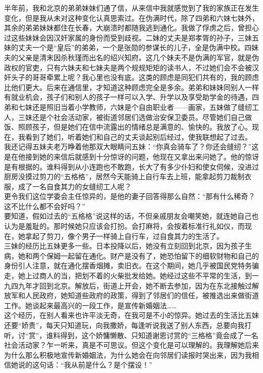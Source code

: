 半年前，我和北京的弟弟妹妹们通了信，从来信中我就感觉到了我的家族正在发生变化，但是我从未对这种变化认真思索过。在伪满时代，除了四弟和六妹七妹外，其余的弟弟妹妹都住在长春，大崩溃时都随我逃到通化。我做了俘虏之后，曾担心过这些妹妹会因汉奸家属的身份而受到歧视。二妹的丈夫是郑孝胥的孙子，三妹五妹的丈夫一个是“皇后”的弟弟，一个是张勋的参谋长的儿子，全是伪满中校。四妹夫的父亲是清末因杀秋瑾而出名的绍兴知府。这几个妹夫不是伪满的军官，就是伪政权的官吏，只有六妹夫和七妹夫是两个规规矩矩的读书人，不过她们会不会被汉奸头子的哥哥牵累上呢？我心里也没有底。这类的顾虑是同犯们共有的，我的顾虑比他们更大。后来在通信里，才知道这种顾虑完全是多余。弟弟和妹妹同别人一样有就业机会，孩子们和别人的孩子一样可以入学、升学以及享受助学金的待遇，四弟和七妹还是照旧当着小学教师，六妹是个自由职业者——画家，五妹做了缝纫工人，三妹还是个社会活动家，被街道邻居们选做治安保卫委员。尽管她们自己做饭、照顾孩子，但是她们在信中流露出的情绪总是满意的、愉快的。我放了心。现在，我看到了她们，听着她们和自己的丈夫谈起别后经过，使我联想起了过去。\\

我还记得五妹夫老万睁着他那双大眼睛问五妹：“你真会骑车了？你还会缝纫？”这是在他接到她的来信后就感到十分惊讶的问题，他现在又拿出来问她了。他的惊讶是有根据的。谁料得到从小连跑也不敢跑，长大了有多少仆妇和使女伺候，没进过厨房没摸过剪刀的“五格格”，居然今天能骑上自行车去上班，能拿起剪刀裁制衣服，成了一名自食其力的女缝纫工人呢？\\

更令我们这位学委会主任惊异的，是他的妻子回答得那么自然：“那有什么稀奇？这不比什么都不会好吗？”\\

要知道，假如过去的“五格格”说这样的话，不但亲戚朋友会嘲笑她，就连她自己也认为是羞耻的。那时候她只应该会打扮。会打麻将，会按着标准行礼如仪，而现在，她拿起了剪刀，像个男子一样骑上自行车，过自食其力的生活了。\\

三妹的经历比五妹更多一些。日本投降以后，她没有立刻回到北京，因为孩子生病，她和两个保姆一起留在通化。财产是没有了，她恐怕留下的细软财物和自己的身份引人注意，就在通化摆香烟摊，卖旧衣。在这个期间，她几乎被国民党特务骗走，她上过商人的当，把划不着的火柴批发给她。她经过这些不平常的生活，到一九四九年才回到北京。解放后，街道上开会，她不断去参加，因为在东北接触过解放军和人民政府，她知道些政府的政策，得到了邻居们的信任，被推选出来做街道工作。她谈起来最高兴的一段工作，是宣传新婚姻法……\\

这个经历，在别人看来也许平淡无奇，在我可是不小的惊异。她过去的生活比五妹还要“娇贵”，每天只知道玩，向我撒娇，每逢听说我送了别人东西，总要向我打听，讨“赏”，谁料得到，这个娇慵懒散、只知道谢恩讨赏的“三格格”竟会成了一名社会活动家？乍一听来，真是不可思议。但这个变化是可以理解的。我理解她后来为什么那么积极地宣传新婚姻法，为什么她会在向邻居们读报时哭出来，因为我相信她说的这句话：“我从前是什么？是个摆设！”\\

